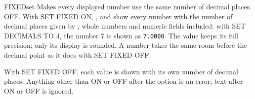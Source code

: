 \begin{XbaseEntry}{FIXED}{set}
Makes every displayed number use the same number of decimal places.
\Syntax
{}
\Defaults
OFF.
\Usage
With SET FIXED ON, ,  and  show every number
with the number of decimal places given by , whole numbers
and numeric fields included: with SET DECIMALS TO 4, the number 7 is shown as
\texttt{7.0000}.  The value keeps its full precision; only its display is
rounded.  A number takes the same room before the decimal point as it does
with SET FIXED OFF.

With SET FIXED OFF, each value is shown with its own number of decimal places.
Anything other than ON or OFF after the option is an error; text after ON or
OFF is ignored.
\end{XbaseEntry}
